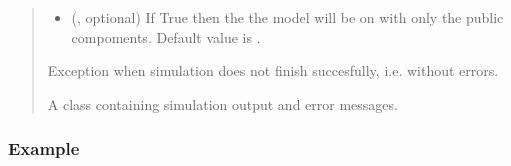 \documentclass[letterpaper,10pt,english]{sphinxmanual}
\begin{document}
\begin{fulllineitems}
\begin{fulllineitems}
\begin{quote}
\begin{description}
\begin{itemize}
\item {} 
\sphinxAtStartPar
{} (, optional) \textendash{} If True then the the model will be on with only the public compoments. Default value is .

\end{itemize}

\sphinxAtStartPar
{} \textendash{} Exception when simulation does not finish succesfully, i.e. without errors.

\sphinxAtStartPar
A class containing simulation output and error messages.

\sphinxAtStartPar
{\hyperref[\detokenize{autoapi/euromod/core/index:euromod.core.Simulation}]{}}

\end{description}\end{quote}
\subsubsection*{Example}


\end{fulllineitems}
\end{fulllineitems}
\end{document}
